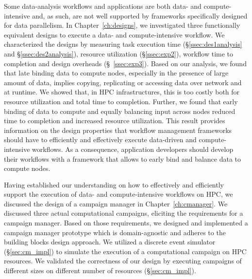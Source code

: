Some data-analysis workflows and applications are both data- and
compute-intensive and, as such, are not well supported by frameworks
specifically designed for data parallelism. In Chapter~\ref{ch:designs}, we
investigated three functionally equivalent designs to execute a data- and
compute-intensive workflow. We characterized the designs by measuring task
execution time (\S\ref{ssec:des1analysis} and \S\ref{ssec:des2analysis}),
resource utilization (\S\ref{ssec:exp2}), workflow time to completion and design
overheads (\S~\ref{ssec:exp3}). Based on our analysis, we found that late
binding data to compute nodes, especially in the presence of large amount of
data, implies copying, replicating or accessing data over network and at
runtime. We showed that, in HPC infrastructures, this is too costly both for
resource utilization and total time to completion. Further, we found that early
binding of data to compute and equally balancing input across nodes reduced time
to completion and increased resource utilization. This result provides
information on the design properties that workflow management frameworks
should have to efficiently and effectively execute data-driven and
compute-intensive workflows. As a consequence, application developers should
develop their workflows with a framework that allows to early bind and balance
data to compute nodes.

Having established our understanding on how to effectively and efficiently
support the execution of data- and compute-intensive workflows on HPC, we
discussed the design of a campaign manager in Chapter~\ref{ch:cmanager}. We
discussed three actual computational campaigns, eliciting the requirements for a
campaign manager. Based on those requirements, we designed and implemented a
campaign manager prototype which is domain-agnostic and adheres to the building
blocks design approach. We utilized a discrete event simulator
(\S\ref{sec:cm_impl}) to simulate the execution of a computational campaign on
HPC resources. We validated the correctness of our design by executing campaigns
of different sizes on different number of resources (\S\ref{sec:cm_impl}). 

